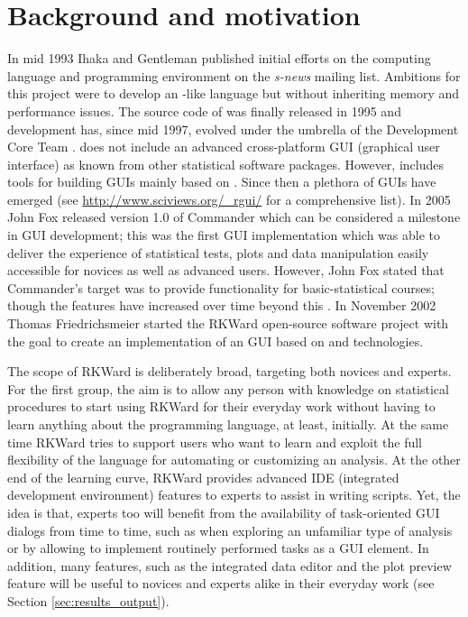 \section{Background and motivation}
\label{background}
In mid 1993 Ihaka and Gentleman published initial efforts on the computing
language and programming environment  on the \emph{s-news} mailing list. Ambitions for
this project were to develop an -like language but without inheriting memory
and performance issues. The source code of  was finally released in 1995 and
development has, since mid 1997, evolved under the umbrella of the  
Development Core Team \citep{RDCT2001, RDCT2010, Ihaka_Gentlemen_1993}.
 does not include an advanced cross-platform GUI (graphical user interface) as known from other
statistical software packages. However,  includes tools for building GUIs
mainly based on  \citep{Dalgaard2001, Dalgaard2002}. Since then a
plethora of  GUIs have emerged (see \url{http://www.sciviews.org/_rgui/} for a
comprehensive list). In 2005 John Fox released version 1.0 of  Commander which
can be considered a milestone in  GUI development; this was the first GUI
implementation which was able to deliver the experience of statistical tests,
plots and data manipulation easily accessible for  novices as well as advanced
users. However, John Fox stated that  Commander's target was to provide
functionality for basic-statistical courses; though the features have increased over
time beyond this \citep{Fox2005, Fox2007}. In November 2002 Thomas Friedrichsmeier
started the RKWard open-source software project with the goal to create an
implementation of an  GUI based on  and  technologies.

The scope of RKWard is deliberately broad, targeting both  novices and experts.
For the first group, the aim is to allow any person with knowledge on
statistical procedures to start using RKWard for their everyday work
without having to learn anything about the  programming language,
at least, initially. At the same time RKWard tries to support users who want to learn and
exploit the full flexibility of the  language for automating or customizing
an analysis. At the other end of the learning curve, RKWard provides advanced IDE (integrated development environment)
features to  experts to assist in writing  scripts. Yet, the idea
is that,  experts too will benefit from the availability of task-oriented GUI
dialogs from time to time, such as when exploring an unfamiliar type of analysis
or by allowing to implement routinely performed tasks as a GUI element. In
addition, many features, such as the integrated data editor and the plot preview
feature will be useful to  novices and  experts alike in their everyday work
(see Section \ref{sec:results_output}).


